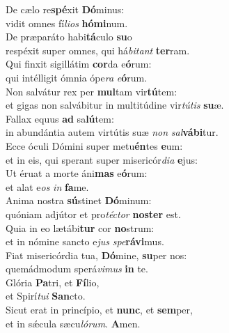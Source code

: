 \evenverse De cælo re\textbf{spé}xit \textbf{Dó}minus:~\*\\
\evenverse vidit omnes fí\textit{li}\textit{os} \textbf{hó}\textbf{mi}num.\\
\oddverse De præparáto habi\textbf{tá}culo \textbf{su}o~\*\\
\oddverse respéxit super omnes, qui há\textit{bi}\textit{tant} \textbf{ter}ram.\\
\evenverse Qui finxit sigillátim \textbf{cor}da e\textbf{ó}rum:~\*\\
\evenverse qui intélligit ómnia ópe\textit{ra} \textit{e}\textbf{ó}rum.\\
\oddverse Non salvátur rex per \textbf{mul}tam vir\textbf{tú}tem:~\*\\
\oddverse et gigas non salvábitur in multitúdine vir\textit{tú}\textit{tis} \textbf{su}æ.\\
\evenverse Fallax equus \textbf{ad} sa\textbf{lú}tem:~\*\\
\evenverse in abundántia autem virtútis suæ \textit{non} \textit{sal}\textbf{vá}\textbf{bi}tur.\\
\oddverse Ecce óculi Dómini super metu\textbf{én}tes \textbf{e}um:~\*\\
\oddverse et in eis, qui sperant super misericór\textit{di}\textit{a} \textbf{e}jus:\\
\evenverse Ut éruat a morte áni\textbf{mas} e\textbf{ó}rum:~\*\\
\evenverse et alat e\textit{os} \textit{in} \textbf{fa}me.\\
\oddverse Anima nostra \textbf{sú}stinet \textbf{Dó}minum:~\*\\
\oddverse quóniam adjútor et pro\textit{té}\textit{ctor} \textbf{no}\textbf{ster} est.\\
\evenverse Quia in eo lætábi\textbf{tur} cor \textbf{no}strum:~\*\\
\evenverse et in nómine sancto e\textit{jus} \textit{spe}\textbf{rá}\textbf{vi}mus.\\
\oddverse Fiat misericórdia tua, \textbf{Dó}mine, \textbf{su}per nos:~\*\\
\oddverse quemádmodum sperá\textit{vi}\textit{mus} \textbf{in} te.\\
\evenverse Glória \textbf{Pa}tri, et \textbf{Fí}lio,~\*\\
\evenverse et Spirí\textit{tu}\textit{i} \textbf{San}cto.\\
\oddverse Sicut erat in princípio, et \textbf{nunc}, et \textbf{sem}per,~\*\\
\oddverse et in sǽcula sæcu\textit{ló}\textit{rum}. \textbf{A}men.\\
